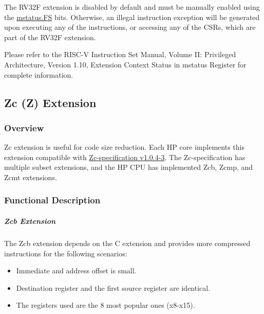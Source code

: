 \documentclass[main\_\_EN.tex]{subfiles}
\begin{document}
The RV32F extension is disabled by default and must be manually enabled using the \hyperref[fielddesc:MSTATUS_FS]{mstatus.FS} bits. Otherwise, an illegal instruction exception will be generated upon executing any of the instructions, or accessing any of the CSRs, which are part of the RV32F extension.

Please refer to the RISC-V Instruction Set Manual, Volume II: Privileged Architecture, Version 1.10, Extension Context Status in mstatus Register for complete information.

\newpage


\newpage
\subsection{Zc (Z) Extension}
\label{sec:riscvcpu-zc}

\subsubsection{Overview}
\label{sec:riscvcpu-zc-overview}

Zc extension is useful for code size reduction. Each HP core implements this extension compatible with \href{https://github.com/riscvarchive/riscv-code-size-reduction/blob/v1.0.4-3/Zc-specification/Zc.adoc}{Zc-specification v1.0.4-3}. The Zc-specification has multiple subset extensions, and the \chipname HP CPU has implemented Zcb, Zcmp, and Zcmt extensions.

\subsubsection{Functional Description}
\label{sec:riscvcpu-zc-func-descr}

\subparagraph{Zcb Extension}

The Zcb extension depends on the C extension and provides more compressed instructions for the following scenarios:

\begin{itemize}
    \item Immediate and address offset is small.
    \item Destination register and the first source register are identical.
    \item The registers used are the 8 most popular ones (x8-x15).
\end{itemize}
\end{document}
